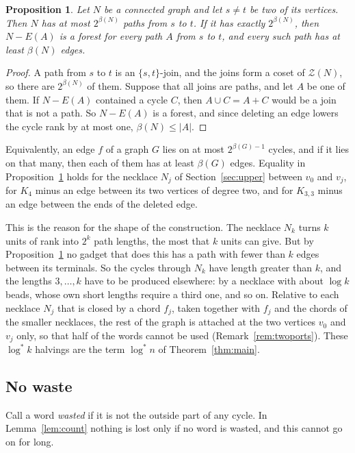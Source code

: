 \documentclass[11pt]{article}
\newtheorem{proposition}[theorem]{Proposition}
\theoremstyle{definition}
\theoremstyle{remark}
\newcommand{\Z}{\mathcal{Z}}
\newcommand{\lgs}{\log^{*}}
\begin{document}
\begin{proposition}\label{prop:terminal}
Let $N$ be a connected graph and let $s\ne t$ be two of its vertices. Then $N$ has at most
$2^{\beta(N)}$ paths from $s$ to $t$. If it has exactly $2^{\beta(N)}$, then $N-E(A)$ is a forest
for every path $A$ from $s$ to $t$, and every such path has at least $\beta(N)$ edges.
\end{proposition}

\begin{proof}
A path from $s$ to $t$ is an $\{s,t\}$-join, and the joins form a coset of $\Z(N)$, so there are
$2^{\beta(N)}$ of them. Suppose that all joins are paths, and let $A$ be one of them. If $N-E(A)$
contained a cycle $C$, then $A\cup C=A+C$ would be a join that is not a path. So $N-E(A)$ is a
forest, and since deleting an edge lowers the cycle rank by at most one, $\beta(N)\le|A|$.
\end{proof}

Equivalently, an edge $f$ of a graph $G$ lies on at most $2^{\beta(G)-1}$ cycles, and if it lies on
that many, then each of them has at least $\beta(G)$ edges. Equality in
Proposition~\ref{prop:terminal} holds for the necklace $N_j$ of Section~\ref{sec:upper} between
$v_0$ and $v_j$, for $K_4$ minus an edge between its two vertices of degree two, and for $K_{3,3}$
minus an edge between the ends of the deleted edge.

This is the reason for the shape of the construction. The necklace $N_k$ turns $k$ units of rank
into $2^{k}$ path lengths, the most that $k$ units can give. But by
Proposition~\ref{prop:terminal} no gadget that does this has a path with fewer than $k$ edges
between its terminals. So the cycles through $N_k$ have length greater than $k$, and the lengths
$3,\dots,k$ have to be produced elsewhere: by a necklace with about $\log k$ beads, whose own short
lengths require a third one, and so on. Relative to each necklace $N_j$ that is closed by a chord $f_j$,
taken together with $f_j$ and the chords of the smaller necklaces, the rest of the graph is attached
at the two vertices $v_0$ and $v_j$ only, so that half of the words cannot be used
(Remark~\ref{rem:twoports}). These $\lgs k$ halvings are the term
$\lgs n$ of Theorem~\ref{thm:main}.

\subsection{No waste}

Call a word \emph{wasted} if it is not the outside part of any cycle. In Lemma~\ref{lem:count}
nothing is lost only if no word is wasted, and this cannot go on for long.
\end{document}
